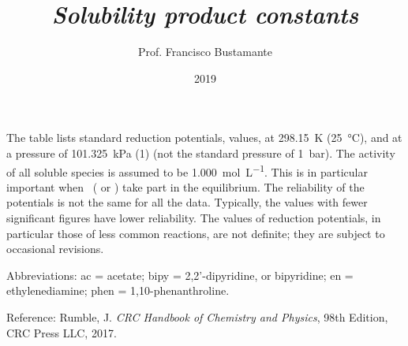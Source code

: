 \documentclass[a4paper, 10pt]{article}
\author{Prof. Francisco Bustamante}
\title{\textit{Solubility product constants}}
\date{2019}
\begin{document}
\footnotesize

\twocolumn

The table lists standard reduction potentials, \ElPot*{} values, at \SI{298.15}{\kelvin} (\SI{25}{\celsius}), and at a pressure of \SI{101.325}{\kilo\pascal} (\SI{1}{\atmosphere}) (not the standard pressure of \SI{1}{\bar}). The activity of all soluble species is assumed to be \SI{1.000}{\mole\per\liter}. This is in particular important when \pH \, ( or ) take part in the equilibrium. The reliability of the potentials is not the same for all the data. Typically, the values with fewer significant figures have lower reliability. The values of reduction potentials, in particular those of less common reactions, are not definite; they are subject to occasional revisions.

Abbreviations: ac = acetate; bipy = 2,2'-dipyridine, or bipyridine; en = ethylenediamine; phen = 1,10-phenanthroline.

Reference: Rumble, J. \textit{CRC Handbook of Chemistry and Physics}, 98th Edition, CRC Press LLC, 2017.

\end{document}
